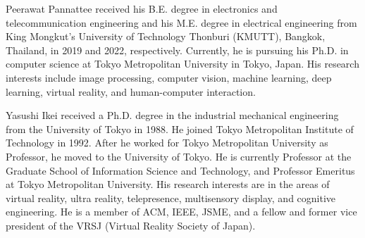 \documentclass{ieeeaccess}
\begin{document}
\begin{IEEEbiography}{Peerawat Pannattee} received his B.E. degree in electronics and telecommunication engineering and his M.E. degree in electrical engineering from King Mongkut’s University of Technology Thonburi (KMUTT), Bangkok, Thailand, in 2019 and 2022, respectively. Currently, he is pursuing his Ph.D. in computer science at Tokyo Metropolitan University in Tokyo, Japan. His research interests include image processing, computer vision, machine learning, deep learning, virtual reality, and human-computer interaction.
\end{IEEEbiography}

\begin{IEEEbiography}{Yasushi Ikei} received a Ph.D. degree in the industrial mechanical engineering from the University of Tokyo in 1988. He joined Tokyo Metropolitan Institute of Technology in 1992. After he worked for Tokyo Metropolitan University as Professor, he moved to the University of Tokyo. He is currently Professor at the Graduate School of Information Science and Technology, and Professor Emeritus at Tokyo Metropolitan University. His research interests are in the areas of virtual reality, ultra reality, telepresence, multisensory display, and cognitive engineering. He is a member of ACM, IEEE, JSME, and a fellow and former vice president of the VRSJ (Virtual Reality Society of Japan).
\end{IEEEbiography}
\end{document}
